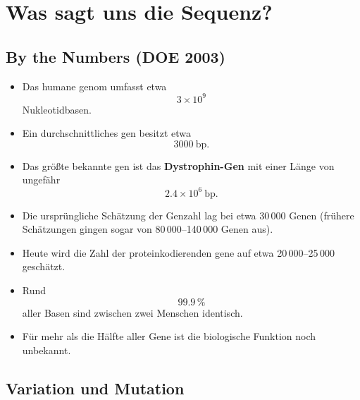 


\section{Was sagt uns die Sequenz?}\label{sec:was-sagt-uns-die-sequenz?}

\subsection*{By the Numbers (DOE 2003)}\label{subsec:by-the-numbers-(doe-2003)}

\begin{itemize}
    \item Das humane \gls{genom} umfasst etwa
    \[
        3 \times 10^{9}
    \]
    Nukleotidbasen.

    \item Ein durchschnittliches \gls{gen} besitzt etwa
    \[
        3000\ \mathrm{bp}.
    \]

    \item Das größte bekannte \gls{gen} ist das
    \textbf{Dystrophin-Gen}
    mit einer Länge von ungefähr
    \[
        2.4 \times 10^{6}\ \mathrm{bp}.
    \]

    \item Die ursprüngliche Schätzung der Genzahl lag bei etwa
    30\,000 Genen
    (frühere Schätzungen gingen sogar von
    80\,000--140\,000 Genen aus).

    \item Heute wird die Zahl der proteinkodierenden \gls{gen}e auf
    etwa 20\,000--25\,000 geschätzt.

    \item Rund
    \[
        99.9\,\%
    \]
    aller Basen sind zwischen zwei Menschen identisch.

    \item Für mehr als die Hälfte aller Gene
    ist die biologische Funktion noch unbekannt.
\end{itemize}


\subsection*{Variation und Mutation}\label{subsec:variation-und-mutation}

